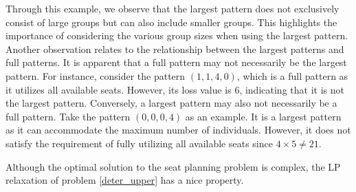 
Through this example, we observe that the largest pattern does not exclusively consist of large groups but can also include smaller groups. This highlights the importance of considering the various group sizes when using the largest pattern. Another observation relates to the relationship between the largest patterns and full patterns. It is apparent that a full pattern may not necessarily be the largest pattern. For instance, consider the pattern $(1, 1, 4, 0)$, which is a full pattern as it utilizes all available seats. However, its loss value is 6, indicating that it is not the largest pattern. Conversely, a largest pattern may also not necessarily be a full pattern. Take the pattern $(0, 0, 0, 4)$ as an example. It is a largest pattern as it can accommodate the maximum number of individuals. However, it does not satisfy the requirement of fully utilizing all available seats since $4 \times 5 \neq 21$.



Although the optimal solution to the seat planning problem is complex, the LP relaxation of problem \eqref{deter_upper} has a nice property.

